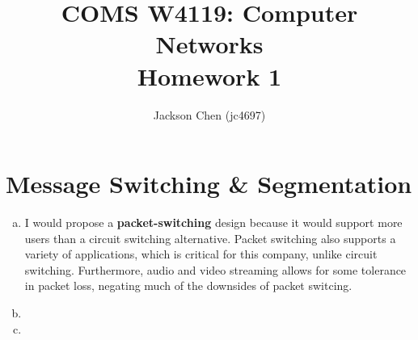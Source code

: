 \documentclass[11pt]{article}
\begin{document}

\title{COMS W4119: Computer Networks\\
       Homework 1}
\author{Jackson Chen (jc4697)} %
\maketitle

\section*{Message Switching \& Segmentation}
  \begin{enumerate}[(a)]
    \item
      I would propose a \textbf{packet-switching} design because it would support more
      users than a circuit switching alternative. Packet switching also supports a variety
      of applications, which is critical for this company, unlike circuit switching.
      Furthermore, audio and video streaming allows for some tolerance in packet loss,
      negating much of the downsides of packet switcing.
    \item

    \item

  \end{enumerate}
\end{document}
